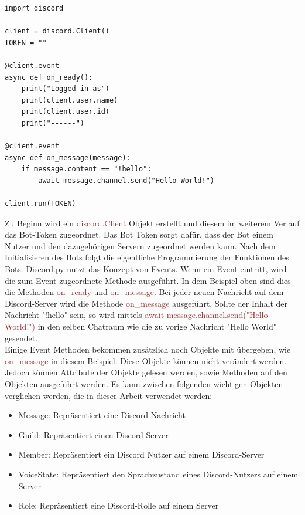 \documentclass[sigplan,screen]{acmart}
\begin{document}
\begin{lstlisting}
import discord

client = discord.Client()
TOKEN = ""

@client.event
async def on_ready():
    print("Logged in as")
    print(client.user.name)
    print(client.user.id)
    print("------")

@client.event
async def on_message(message):
    if message.content == "!hello":
        await message.channel.send("Hello World!")

client.run(TOKEN)
\end{lstlisting} 


\noindent Zu Beginn wird ein \textcolor{brown}{discord.Client} Objekt erstellt und diesem im weiterem Verlauf das Bot-Token zugeordnet. Das Bot Token sorgt dafür, dass der Bot einem Nutzer und den dazugehörigen Servern zugeordnet werden kann. Nach dem Initialisieren des Bots folgt die eigentliche Programmierung der Funktionen des Bots. 
Discord.py nutzt das Konzept von Events. Wenn ein Event eintritt, wird die zum Event zugeordnete Methode ausgeführt. In dem Beispiel oben sind dies die Methoden \textcolor{brown}{on\_ready} und  \textcolor{brown}{on\_message}.
Bei jeder neuen Nachricht auf dem Discord-Server wird die Methode \textcolor{brown}{on\_message} ausgeführt. Sollte der Inhalt der Nachricht "!hello" sein, so wird mittels \textcolor{brown}{await message.channel.send("Hello World!")} in den selben Chatraum wie die zu vorige Nachricht "Hello World" gesendet. \\
\noindent Einige Event Methoden bekommen zusätzlich noch Objekte mit übergeben, wie \textcolor{brown}{on\_message} in diesem Beispiel. Diese Objekte können nicht verändert werden. Jedoch können Attribute der Objekte gelesen werden, sowie Methoden auf den Objekten ausgeführt werden. Es kann zwischen folgenden wichtigen Objekten verglichen werden, die in dieser Arbeit verwendet werden: \cite{pcdoc1} 

\begin{itemize}
\item Message: Repräsentiert eine Discord Nachricht
\item Guild: Repräsentiert einen Discord-Server
\item Member: Repräsentiert ein Discord Nutzer auf einem Discord-Server
\item VoiceState: Repräsentiert den Sprachzustand eines Discord-Nutzers auf einem Server
\item Role: Repräsentiert eine Discord-Rolle auf einem Server
\end{itemize}
\end{document}
